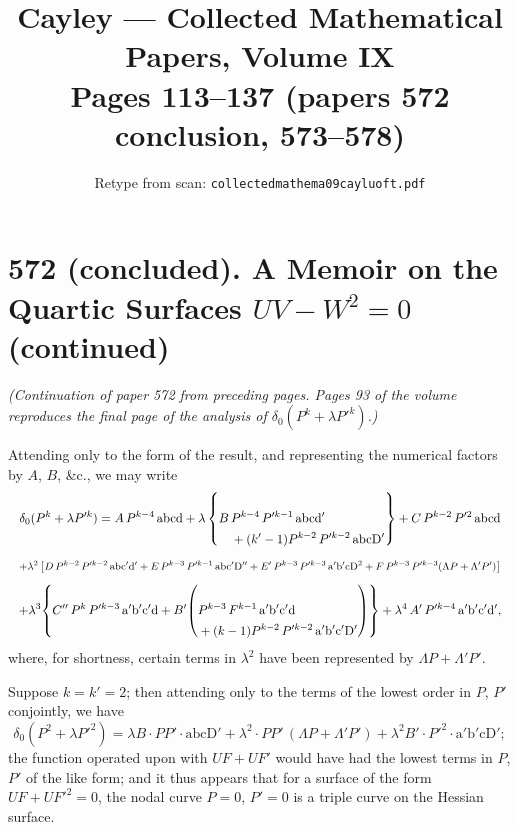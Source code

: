 \documentclass[11pt]{article}
\title{Cayley --- Collected Mathematical Papers, Volume IX\\Pages 113--137 (papers 572 conclusion, 573--578)}
\author{Retype from scan: \texttt{collectedmathema09cayluoft.pdf}}
\date{}
\begin{document}
\maketitle

\section*{572 (concluded). A Memoir on the Quartic Surfaces $UV-W^{2}=0$ (continued)}

\noindent\textit{(Continuation of paper 572 from preceding pages. Pages 93 of the volume reproduces the final page of the analysis of $\delta_{0}(P^{k}+\lambda P'^{k})$.)}

\medskip

Attending only to the form of the result, and representing the numerical factors by $A$, $B$, \&c., we may write
\[ \resizebox{\textwidth}{!}{$\displaystyle
\delta_{0}(P^{k}+\lambda P'^{k}) =
A\,P^{k-4}\,\mathrm{abcd}
+ \lambda \left\{ B\,\begin{aligned}[t]&P^{k-4}\,P'^{k-1}\,\mathrm{abcd'}\\&+(k'-1)P^{k-2}\,P'^{k-2}\,\mathrm{abcD'}\end{aligned}\right\}
+ C\,P^{k-2}\,P'^{2}\,\mathrm{abcd}
$} \]
\[ \resizebox{\textwidth}{!}{$\displaystyle
+ \lambda^{2}\left[ D\,P^{k-2}\,P'^{k-2}\,\mathrm{abc'd'}
+ E\,P^{k-3}\,P'^{k-1}\,\mathrm{abc'D''}
+ E'\,P^{k-3}\,P'^{k-3}\,\mathrm{a'b'cD^{2}}
+ F\,P^{k-3}\,P'^{k-3}(\Lambda P+\Lambda'P')\right]
$} \]
\[ \resizebox{\textwidth}{!}{$\displaystyle
+\lambda^{3}\!\left\{ C''\,P^{k}\,P'^{k-3}\,\mathrm{a'b'c'd}
+ B'\!\left(\begin{aligned}[t]&P^{k-3}\,F^{k-1}\,\mathrm{a'b'c'd}\\&+(k-1)P^{k-2}\,P'^{k-2}\,\mathrm{a'b'c'D'}\end{aligned}\right)\right\}
+ \lambda^{4}\,A'\,P'^{k-4}\,\mathrm{a'b'c'd'},
$} \]
where, for shortness, certain terms in $\lambda^{2}$ have been represented by $\Lambda P + \Lambda' P'$.

Suppose $k=k'=2$; then attending only to the terms of the lowest order in $P$, $P'$ conjointly, we have
\[
\delta_{0}(P^{2}+\lambda P'^{2}) = \lambda B \cdot PP' \cdot \mathrm{abcD'}
+ \lambda^{2}\!\cdot\! PP'\,(\Lambda P+\Lambda'P')
+ \lambda^{2} B' \cdot P'^{2}\cdot \mathrm{a'b'cD'};
\]
the function operated upon with $UF+UF'$ would have had the lowest terms in $P$, $P'$ of the like form; and it thus appears that for a surface of the form $UF+UF'^{2}=0$, the nodal curve $P=0$, $P'=0$ is a triple curve on the Hessian surface.
\end{document}
